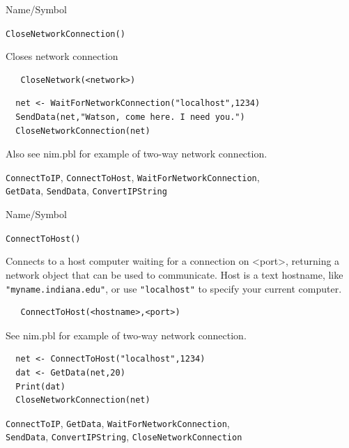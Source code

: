 \begin{desc}{Name/Symbol}
\item[Name/Symbol]	\verb+CloseNetworkConnection()+

\item[Description]	Closes network connection

\item[Usage]
\begin{verbatim}
   CloseNetwork(<network>)
\end{verbatim}

\item[Example]	

\begin{verbatim}
  net <- WaitForNetworkConnection("localhost",1234)
  SendData(net,"Watson, come here. I need you.")
  CloseNetworkConnection(net)
\end{verbatim}
Also see nim.pbl for example of two-way network connection.
\item[See Also]
  \verb+ConnectToIP+, \verb+ConnectToHost+,  \verb+WaitForNetworkConnection+, \\
  \verb+GetData+,  \verb+SendData+, \verb+ConvertIPString+
\end{desc}





\begin{desc}{Name/Symbol}
\item[Name/Symbol]	\verb+ConnectToHost()+

\item[Description]	Connects to a host computer waiting for a
  connection on <port>, returning a network object that can be used to
  communicate.  Host is a text hostname, like \verb+"myname.indiana.edu"+, or
  use \verb+"localhost"+ to specify your current computer.

\item[Usage]
\begin{verbatim}
   ConnectToHost(<hostname>,<port>)
\end{verbatim}

\item[Example]	

  See nim.pbl for example of two-way network connection.
\begin{verbatim}
  net <- ConnectToHost("localhost",1234)
  dat <- GetData(net,20)
  Print(dat)
  CloseNetworkConnection(net)
\end{verbatim}

\item[See Also]
  \verb+ConnectToIP+, \verb+GetData+, 
\verb+WaitForNetworkConnection+,\\
 \verb+SendData+, \verb+ConvertIPString+, \verb+CloseNetworkConnection+
\end{desc}



